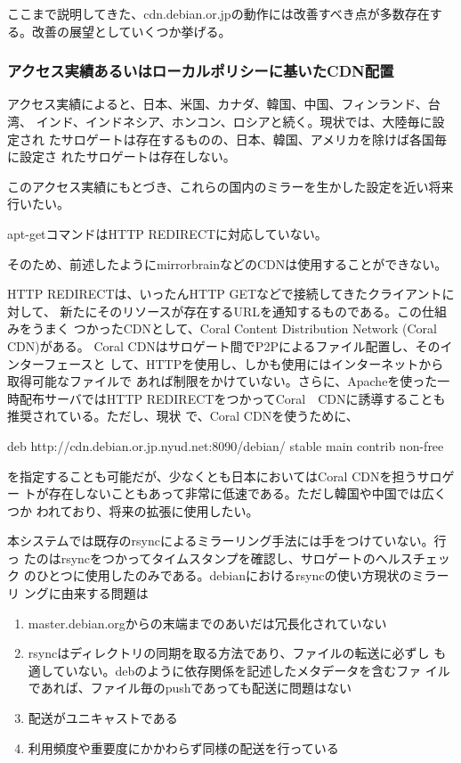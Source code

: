 \documentclass[mingoth,a4paper]{jsarticle}
\begin{document}
ここまで説明してきた、cdn.debian.or.jpの動作には改善すべき点が多数存在する。改善の展望としていくつか挙げる。

\subsubsection{アクセス実績あるいはローカルポリシーに基いたCDN配置}

アクセス実績によると、日本、米国、カナダ、韓国、中国、フィンランド、台湾、
インド、インドネシア、ホンコン、ロシアと続く。現状では、大陸毎に設定され
たサロゲートは存在するものの、日本、韓国、アメリカを除けば各国毎に設定さ
れたサロゲートは存在しない。

このアクセス実績にもとづき、これらの国内のミラーを生かした設定を近い将来
行いたい。


apt-getコマンドはHTTP REDIRECTに対応していない。

そのため、前述したようにmirrorbrainなどのCDNは使用することができない。

HTTP REDIRECTは、いったんHTTP GETなどで接続してきたクライアントに対して、
新たにそのリソースが存在するURLを通知するものである。この仕組みをうまく
つかったCDNとして、Coral Content Distribution Network (Coral CDN)がある。
Coral CDNはサロゲート間でP2Pによるファイル配置し、そのインターフェースと
して、HTTPを使用し、しかも使用にはインターネットから取得可能なファイルで
あれば制限をかけていない。さらに、Apacheを使った一時配布サーバではHTTP
REDIRECTをつかってCoral　CDNに誘導することも推奨されている。ただし、現状
で、Coral CDNを使うために、

\begin{commandline}
deb http://cdn.debian.or.jp.nyud.net:8090/debian/ stable main contrib non-free
\end{commandline}

を指定することも可能だが、少なくとも日本においてはCoral CDNを担うサロゲー
トが存在しないこともあって非常に低速である。ただし韓国や中国では広くつか
われており、将来の拡張に使用したい。


本システムでは既存のrsyncによるミラーリング手法には手をつけていない。行っ
たのはrsyncをつかってタイムスタンプを確認し、サロゲートのヘルスチェック
のひとつに使用したのみである。debianにおけるrsyncの使い方現状のミラーリ
ングに由来する問題は

\begin{enumerate}
 \item master.debian.orgからの末端までのあいだは冗長化されていない
 \item rsyncはディレクトリの同期を取る方法であり、ファイルの転送に必ずし
       も適していない。debのように依存関係を記述したメタデータを含むファ
       イルであれば、ファイル毎のpushであっても配送に問題はない
 \item 配送がユニキャストである
 \item 利用頻度や重要度にかかわらず同様の配送を行っている　
\end{enumerate}
\end{document}
